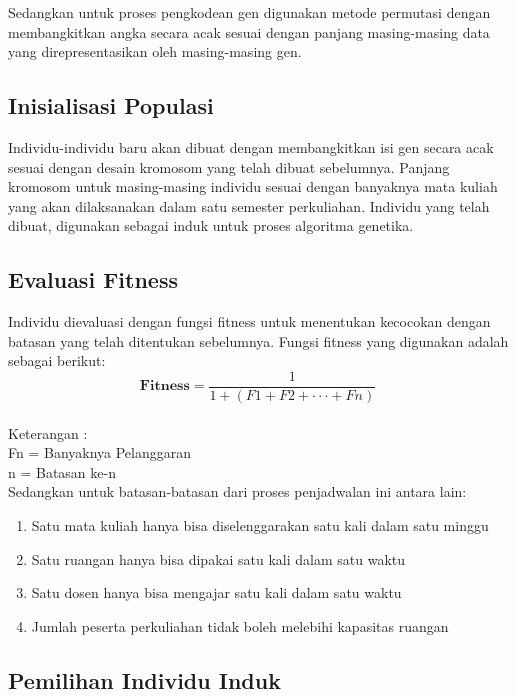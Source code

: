 Sedangkan untuk proses pengkodean gen digunakan metode permutasi dengan \linebreak membangkitkan angka secara acak sesuai dengan panjang masing-masing data yang direpresentasikan oleh masing-masing gen.

\subsection{Inisialisasi Populasi}
  
  Individu-individu baru akan dibuat dengan membangkitkan isi gen secara acak sesuai \linebreak dengan desain kromosom yang telah dibuat sebelumnya. Panjang kromosom untuk masing-masing individu sesuai dengan banyaknya mata kuliah yang akan dilaksanakan dalam satu semester perkuliahan. Individu yang telah dibuat, digunakan sebagai induk untuk proses algoritma genetika.
  
  \subsection{Evaluasi Fitness}
  
  Individu dievaluasi dengan fungsi fitness untuk menentukan kecocokan dengan batasan yang telah ditentukan sebelumnya. Fungsi fitness yang digunakan adalah sebagai berikut:
  \begin{equation}
    \label{eq:fitness2}
    \mathbf{Fitness} = \frac{1}{1 + (F1 + F2 + \cdot \cdot \cdot +  Fn)}\; 
  \end{equation}\\
  Keterangan :\\
  Fn = Banyaknya Pelanggaran\\
  n  = Batasan ke-n\\

  Sedangkan untuk batasan-batasan dari proses penjadwalan ini antara lain:
  \begin{enumerate}
    \item Satu mata kuliah hanya bisa diselenggarakan satu kali dalam satu minggu
    \item Satu ruangan hanya bisa dipakai satu kali dalam satu waktu
    \item Satu dosen hanya bisa mengajar satu kali dalam satu waktu
    \item Jumlah peserta perkuliahan tidak boleh melebihi kapasitas ruangan
  \end{enumerate} 
 
  \subsection{Pemilihan Individu Induk}
  
